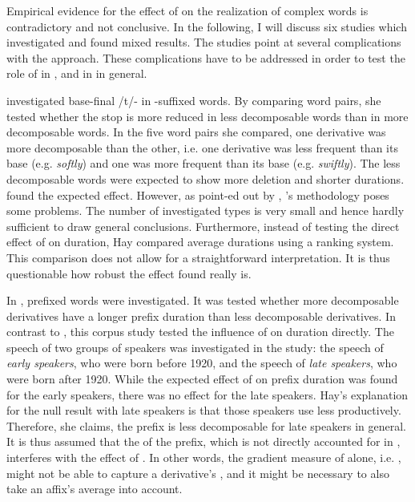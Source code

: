 Empirical evidence for the effect of  on the realization of complex words is contradictory and not conclusive. In the following, I will discuss six studies which investigated  and found mixed results. The studies point at several complications with the approach. These complications have to be addressed in order to test the role of  in , and in  in general. 

 \cite{Hay.2003} investigated  base-final /t/- in -suffixed words. By comparing word pairs, she tested whether the stop is more reduced in less decomposable words than in more decomposable words. In the five word pairs she compared, one derivative was more decomposable than the other, i.e. one derivative was less frequent than its base (e.g. \textit{softly}) and one was more frequent than its base (e.g. \textit{swiftly}). The less decomposable words were expected to show more deletion and shorter durations.  \citeauthor{Hay.2003} found the expected effect. 
 However, as point-ed out by \cite{Hanique.2012}, \citeauthor{Hay.2003}'s methodology poses some problems. The number of investigated types is very small and hence hardly sufficient to draw general conclusions. Furthermore, instead of testing the direct effect of  on duration, Hay compared average durations using a ranking system. This comparison does not allow for a straightforward interpretation. It is thus questionable how robust the effect found really is.

In \citet{Hay.2007},  prefixed words were investigated. It was tested whether more decomposable derivatives have a longer prefix duration than less decomposable  derivatives.  In contrast to \cite{Hay.2003}, this corpus study tested the influence of  on duration directly. The speech of two groups of speakers was investigated in the study: the speech of \textit{early speakers}, who were born before 1920, and the speech of \textit{late speakers}, who were born after 1920. 
While the expected effect of  on prefix duration was found for the early speakers, there was no effect  for the late speakers. Hay's explanation for the null result with late speakers is that those speakers use  less productively. Therefore, she claims, the prefix is less decomposable for late speakers in general. It is thus assumed that the  of the prefix, which is not directly accounted for in , interferes with the effect of . In other words, the gradient measure of  alone, i.e. , might not be able to capture a derivative's , and it might be necessary to also take an affix's average  into account.
 
